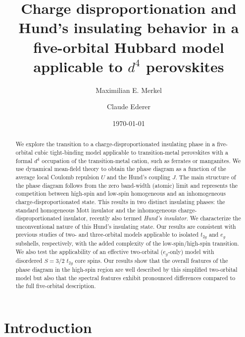 \documentclass[aps,prb,twocolumn,superscriptaddress,10pt]{revtex4-1}
\begin{document}
\title{Charge disproportionation and Hund's insulating behavior in a five-orbital Hubbard model applicable to $d^4$ perovskites}
\author{Maximilian E. Merkel}
\author{Claude Ederer}

\date{\today}

\begin{abstract}
We explore the transition to a charge-disproportionated insulating phase in a five-orbital cubic tight-binding model applicable to transition-metal perovskites with a formal $d^4$ occupation of the transition-metal cation, such as ferrates or manganites. We use dynamical mean-field theory to obtain the phase diagram as a function of the average local Coulomb repulsion $U$ and the Hund's coupling $J$. The main structure of the phase diagram follows from the zero band-width (atomic) limit and represents the competition between high-spin and low-spin homogeneous and an inhomogeneous charge-disproportionated state. This results in two distinct insulating phases: the standard homogeneous Mott insulator and the inhomogeneous charge-disproportionated insulator, recently also termed \emph{Hund's insulator}. We characterize the unconventional nature of this Hund's insulating state.
%
Our results are consistent with previous studies of two- and three-orbital models applicable to isolated $t_{2g}$ and $e_g$ subshells, respectively, with the added complexity of the low-spin/high-spin transition.
%
We also test the applicability of an effective two-orbital ($e_g$-only) model with disordered $S=3/2$ $t_{2g}$ core spins. Our results show that the overall features of the phase diagram in the high-spin region are well described by this simplified two-orbital model but also that the spectral features exhibit pronounced differences compared to the full five-orbital description.
\end{abstract}

\maketitle

\section{Introduction}\label{sec:introduction}
\end{document}
